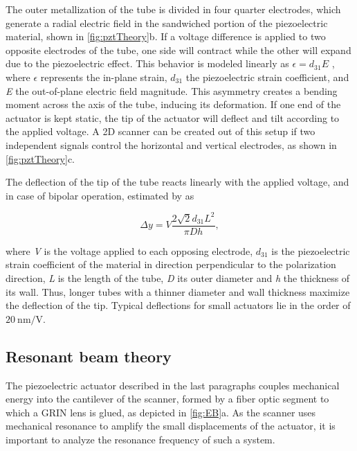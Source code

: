 The outer metallization of the tube is divided in four quarter electrodes, which generate a radial electric field in the sandwiched portion of the piezoelectric material, shown in \autoref{fig:pztTheory}b. If a voltage difference is applied to two opposite electrodes of the tube, one side will contract while the other will expand due to the piezoelectric effect. This behavior is modeled linearly  as $\epsilon = d_{31} E$ \cite{Arnau2008}, where $\epsilon$ represents the in-plane strain, $d_{31}$ the piezoelectric strain coefficient, and \textit{E} the out-of-plane electric field magnitude. This asymmetry creates a bending moment across the axis of the tube, inducing its deformation. If one end of the actuator is kept static, the tip of the actuator will deflect and tilt according to the applied voltage. A 2D scanner can be created out of this setup if two independent signals control the horizontal and vertical electrodes, as shown in \autoref{fig:pztTheory}c.

The deflection of the tip of the tube reacts linearly with the applied voltage, and in case of bipolar operation, estimated by \cite{Chen} as

\begin{equation}
\Delta y = V  \frac{2 \sqrt{2} d_{31} L^2}{\pi D h},
\end{equation}

where \textit{V} is the voltage applied to each opposing electrode, $d_{31}$ is the piezoelectric strain coefficient of the material in direction perpendicular to the polarization direction, \textit{L} is the length of the tube, \textit{D} its outer diameter and \textit{h} the thickness of its wall. Thus, longer tubes with a thinner diameter and wall thickness maximize the deflection of the tip. Typical deflections for small actuators lie in the order of $\SI{20}{\nano\meter / \volt}$.


\subsection{Resonant beam theory}
\label{sec:EB}
The piezoelectric actuator described in the last paragraphs couples mechanical energy into the cantilever of the scanner, formed by a fiber optic segment to which a GRIN lens is glued, as depicted in \autoref{fig:EB}a. As the scanner uses mechanical resonance to amplify the small displacements of the actuator, it is important to analyze the resonance frequency of such a system. 


